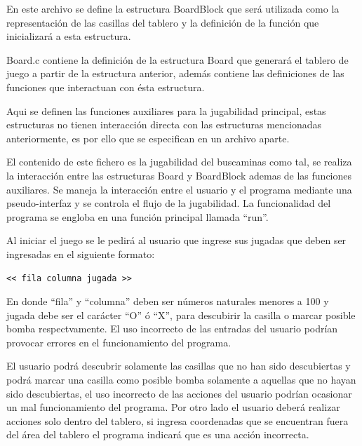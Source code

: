 \documentclass[letterpaper,12pt]{report}
\begin{document}
\begin{description}[align=left]

\item [`` \_~ ''] 
    En este archivo se define la estructura BoardBlock que será utilizada como la representación de las casillas del tablero y la definición de la función que inicializará a esta estructura. 

\item [`` ' '':]
    Board.c contiene la definición de la estructura Board que generará el tablero de juego a partir de la estructura anterior, además contiene las definiciones de las funciones que interactuan con ésta estructura.

\item [`` * '':]
    Aqui se definen las funciones auxiliares para la jugabilidad principal, estas estructuras no tienen interacción directa con las estructuras mencionadas anteriormente, es por ello que se especifican en un archivo aparte.

\item [número:]
    El contenido de este fichero es la jugabilidad del buscaminas como tal, se realiza la interacción entre las estructuras Board y BoardBlock ademas de las funciones auxiliares. Se maneja la interacción entre el usuario y el programa mediante una pseudo-interfaz y se controla el flujo de la jugabilidad. La funcionalidad del programa se engloba en una función principal llamada ``run''.

\end{description}

Al iniciar el juego se le pedirá al usuario que ingrese sus jugadas que deben ser ingresadas en el siguiente formato:

\begin{lstlisting}[language=txt]
<< fila columna jugada >>
\end{lstlisting}

En donde ``fila'' y ``columna'' deben ser números naturales menores a 100 y jugada debe ser el carácter ``O'' ó ``X'', para descubirir la casilla o marcar posible bomba respectvamente. El uso incorrecto de las entradas del usuario podrían provocar errores en el funcionamiento del programa.

El usuario podrá descubrir solamente las casillas que no han sido descubiertas y podrá marcar una casilla como posible bomba solamente a aquellas que no hayan sido descubiertas, el uso incorrecto de las acciones del usuario podrían ocasionar un mal funcionamiento del programa. Por otro lado el usuario deberá realizar acciones solo dentro del tablero, si ingresa coordenadas que se encuentran fuera del área del tablero el programa indicará que es una acción incorrecta.
\end{document}
